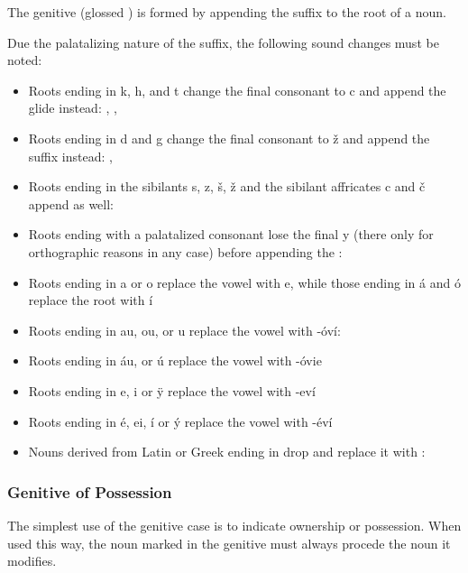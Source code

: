 The genitive (glossed ) is formed by appending the suffix  to the root of a noun.

Due the palatalizing nature of the suffix, the following sound changes must be noted:

\begin{itemize}
	\item Roots ending in k, h, and t change the final consonant to c and append the glide  instead:  ,  ,  
	\item Roots ending in d and g change the final consonant to ž and append the suffix  instead:  ,  
	\item Roots ending in the sibilants s, z, š, ž and the sibilant affricates c and č append  as well:
	\item Roots ending with a palatalized consonant lose the final y (there only for orthographic reasons in any case) before appending the : 
	\item Roots ending in a or o replace the vowel with e, while those ending in á and ó replace the root with í
	\item Roots ending in au, ou, or u replace the vowel with -óví:  
	\item Roots ending in áu, or ú replace the vowel with -óvie
	\item Roots ending in e, i or \"y replace the vowel with -eví
	\item Roots ending in é, ei, í or \'y replace the vowel with -éví
  \item Nouns derived from Latin or Greek ending in  drop  and replace it with : 
\end{itemize}


\subsubsection{Genitive of Possession}

The simplest use of the genitive case is to indicate ownership or possession.
When used this way, the noun marked in the genitive must always procede the noun
it modifies.


\pex
{}\\
\\
\xe

